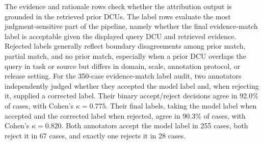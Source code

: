\documentclass[11pt]{article}
\begin{document}
The evidence and rationale rows check whether the attribution output is grounded in the retrieved prior DCUs.
The label rows evaluate the most judgment-sensitive part of the pipeline, namely whether the final evidence-match label is acceptable given the displayed query DCU and retrieved evidence.
Rejected labels generally reflect boundary disagreements among prior match, partial match, and no prior match, especially when a prior DCU overlaps the query in task or source but differs in domain, scale, annotation protocol, or release setting.
For the 350-case evidence-match label audit, two annotators independently judged whether they accepted the model label and, when rejecting it, supplied a corrected label.
Their binary accept/reject decisions agree in 92.0\% of cases, with Cohen's $\kappa=0.775$.
Their final labels, taking the model label when accepted and the corrected label when rejected, agree in 90.3\% of cases, with Cohen's $\kappa=0.820$.
Both annotators accept the model label in 255 cases, both reject it in 67 cases, and exactly one rejects it in 28 cases.
\end{document}
